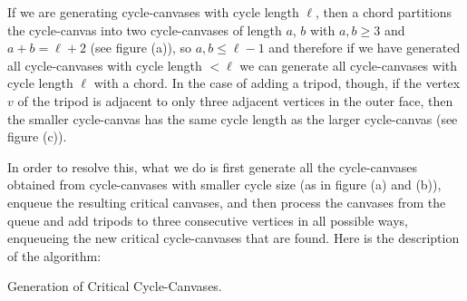 If we are generating cycle-canvases with cycle length $\ell$, then a chord partitions
the cycle-canvas into two cycle-canvases of length $a$, $b$ with $a, b \geq 3$ and $a + b = \ell + 2$ (see figure (a)), so 
$a, b \leq \ell-1$ and therefore if we have generated all cycle-canvases with cycle length $< \ell$ we can generate
all cycle-canvases with cycle length $\ell$ with a chord. In the case of adding a tripod, though, if the vertex $v$ of
the tripod is adjacent to only three adjacent vertices in the outer face, then the smaller cycle-canvas has the same
cycle length as the larger cycle-canvas (see figure (c)).

In order to resolve this, what we do is first generate all the cycle-canvases obtained from cycle-canvases with smaller cycle size 
(as in figure (a) and (b)), enqueue the resulting critical canvases, and then process the canvases from the queue and add tripods 
to three consecutive vertices in all possible ways, enqueueing the new critical cycle-canvases that are found. Here is the description 
of the algorithm:

\begin{algorithm}[H]
\caption{Generation of Critical Cycle-Canvases.}
\SetAlgoLined
{}



\end{algorithm}

